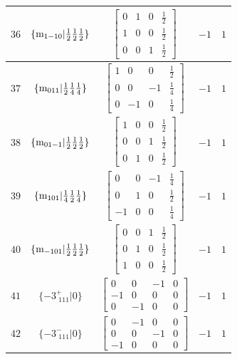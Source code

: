 \documentclass[fleqn,8pt]{jsarticle}
\begin{document}
\begin{longtable}{ccccc}
$ 36 $ & $ \{{\rm m}_{1-10}|\frac{1}{2} \frac{1}{2} \frac{1}{2}\} $ & $ \begin{bmatrix} 0 & 1 & 0 & \frac{1}{2} \\ 1 & 0 & 0 & \frac{1}{2} \\ 0 & 0 & 1 & \frac{1}{2} \end{bmatrix} $ & $ -1 $ & $ 1 $ \\ \hline
$ 37 $ & $ \{{\rm m}_{011}|\frac{1}{2} \frac{1}{4} \frac{1}{4}\} $ & $ \begin{bmatrix} 1 & 0 & 0 & \frac{1}{2} \\ 0 & 0 & -1 & \frac{1}{4} \\ 0 & -1 & 0 & \frac{1}{4} \end{bmatrix} $ & $ -1 $ & $ 1 $ \\ \hline
$ 38 $ & $ \{{\rm m}_{01-1}|\frac{1}{2} \frac{1}{2} \frac{1}{2}\} $ & $ \begin{bmatrix} 1 & 0 & 0 & \frac{1}{2} \\ 0 & 0 & 1 & \frac{1}{2} \\ 0 & 1 & 0 & \frac{1}{2} \end{bmatrix} $ & $ -1 $ & $ 1 $ \\ \hline
$ 39 $ & $ \{{\rm m}_{101}|\frac{1}{4} \frac{1}{2} \frac{1}{4}\} $ & $ \begin{bmatrix} 0 & 0 & -1 & \frac{1}{4} \\ 0 & 1 & 0 & \frac{1}{2} \\ -1 & 0 & 0 & \frac{1}{4} \end{bmatrix} $ & $ -1 $ & $ 1 $ \\ \hline
$ 40 $ & $ \{{\rm m}_{-101}|\frac{1}{2} \frac{1}{2} \frac{1}{2}\} $ & $ \begin{bmatrix} 0 & 0 & 1 & \frac{1}{2} \\ 0 & 1 & 0 & \frac{1}{2} \\ 1 & 0 & 0 & \frac{1}{2} \end{bmatrix} $ & $ -1 $ & $ 1 $ \\ \hline
$ 41 $ & $ \{-3^{+}_{\,\,111}|0\} $ & $ \begin{bmatrix} 0 & 0 & -1 & 0 \\ -1 & 0 & 0 & 0 \\ 0 & -1 & 0 & 0 \end{bmatrix} $ & $ -1 $ & $ 1 $ \\ \hline
$ 42 $ & $ \{-3^{-}_{\,\,111}|0\} $ & $ \begin{bmatrix} 0 & -1 & 0 & 0 \\ 0 & 0 & -1 & 0 \\ -1 & 0 & 0 & 0 \end{bmatrix} $ & $ -1 $ & $ 1 $ \\ \hline

\end{longtable}
\end{document}
